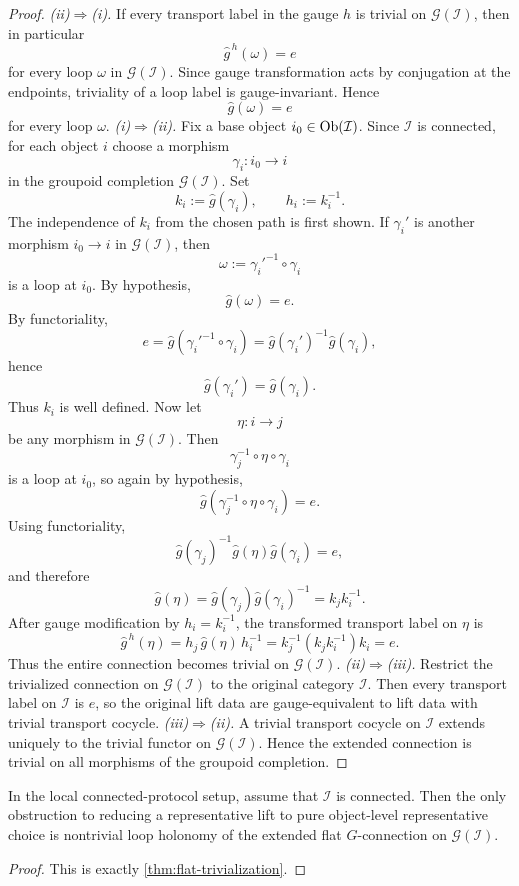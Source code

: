 \begin{proof}
	\emph{\textup{(ii)}\(\Rightarrow\)\textup{(i)}.}
	If every transport label in the gauge \(h\) is trivial on
	\(\mathcal G(\mathcal I)\), then in particular
	\[
		\widehat g^{\,h}(\omega)=e
	\]
	for every loop \(\omega\) in \(\mathcal G(\mathcal I)\).
	Since gauge transformation acts by conjugation at the endpoints,
	triviality of a loop label is gauge-invariant.
	Hence
	\[
		\widehat g(\omega)=e
	\]
	for every loop \(\omega\).
	\smallskip
	\noindent
	\emph{\textup{(i)}\(\Rightarrow\)\textup{(ii)}.}
	Fix a base object \(i_0\in\operatorname{Ob}(\mathcal I)\).
	Since \(\mathcal I\) is connected, for each object \(i\) choose a
	morphism
	\[
		\gamma_i:i_0\to i
	\]
	in the groupoid completion \(\mathcal G(\mathcal I)\).
	Set
	\[
		k_i:=\widehat g(\gamma_i),
		\qquad
		h_i:=k_i^{-1}.
	\]
	The independence of \(k_i\) from the chosen path is first shown.
	If \(\gamma_i'\) is another morphism \(i_0\to i\) in
	\(\mathcal G(\mathcal I)\), then
	\[
		\omega:=\gamma_i'^{-1}\circ\gamma_i
	\]
	is a loop at \(i_0\).
	By hypothesis,
	\[
		\widehat g(\omega)=e.
	\]
	By functoriality,
	\[
		e
		=
		\widehat g(\gamma_i'^{-1}\circ\gamma_i)
		=
		\widehat g(\gamma_i')^{-1}\widehat g(\gamma_i),
	\]
	hence
	\[
		\widehat g(\gamma_i')=\widehat g(\gamma_i).
	\]
	Thus \(k_i\) is well defined.
	Now let
	\[
		\eta:i\to j
	\]
	be any morphism in \(\mathcal G(\mathcal I)\).
	Then
	\[
		\gamma_j^{-1}\circ\eta\circ\gamma_i
	\]
	is a loop at \(i_0\), so again by hypothesis,
	\[
		\widehat g(\gamma_j^{-1}\circ\eta\circ\gamma_i)=e.
	\]
	Using functoriality,
	\[
		\widehat g(\gamma_j)^{-1}\widehat g(\eta)\widehat g(\gamma_i)=e,
	\]
	and therefore
	\[
		\widehat g(\eta)=\widehat g(\gamma_j)\widehat g(\gamma_i)^{-1}
		= k_j k_i^{-1}.
	\]
	After gauge modification by \(h_i=k_i^{-1}\), the transformed transport
	label on \(\eta\) is
	\[
		\widehat g^{\,h}(\eta)
		=
		h_j\,\widehat g(\eta)\,h_i^{-1}
		=
		k_j^{-1}(k_jk_i^{-1})k_i
		=
		e.
	\]
	Thus the entire connection becomes trivial on
	\(\mathcal G(\mathcal I)\).
	\smallskip
	\noindent
	\emph{\textup{(ii)}\(\Rightarrow\)\textup{(iii)}.}
	Restrict the trivialized connection on \(\mathcal G(\mathcal I)\) to
	the original category \(\mathcal I\).
	Then every transport label on \(\mathcal I\) is \(e\), so the original
	lift data are gauge-equivalent to lift data with trivial transport
	cocycle.
	\smallskip
	\noindent
	\emph{\textup{(iii)}\(\Rightarrow\)\textup{(ii)}.}
	A trivial transport cocycle on \(\mathcal I\) extends uniquely to the
	trivial functor on \(\mathcal G(\mathcal I)\).
	Hence the extended connection is trivial on all morphisms of the
	groupoid completion.
\end{proof}
\begin{corollary}
	In the local connected-protocol setup, assume that \(\mathcal I\) is
	connected.
	Then the only obstruction to reducing a representative lift to pure
	object-level representative choice is nontrivial loop holonomy of the
	extended flat \(G\)-connection on \(\mathcal G(\mathcal I)\).
\end{corollary}
\begin{proof}
	This is exactly \cref{thm:flat-trivialization}.
\end{proof}
